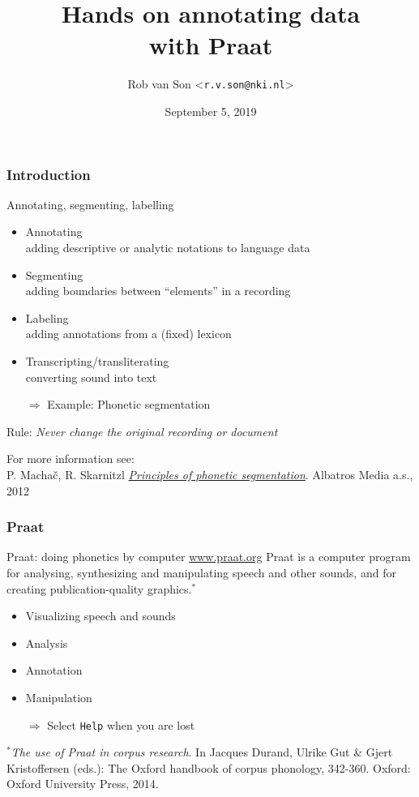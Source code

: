 \documentclass{beamer}
\title{Hands on annotating data\\ with Praat}
\date{September 5, 2019}
\author{Rob van Son <\texttt{r.v.son@nki.nl}>}
\begin{document}
\begin{frame}[plain]
\titlepage
\end{frame}


\begin{frame} 
\frametitle{Introduction} 
\begin{block}{Annotating, segmenting, labelling}
\begin{itemize} 
\item Annotating\\ adding descriptive or analytic notations to language data
\item Segmenting\\ adding boundaries between ``elements'' in a recording
\item Labeling\\ adding annotations from a (fixed) lexicon
\item Transcripting/transliterating\\ converting sound into text
\item[$\Rightarrow$] Example: Phonetic segmentation
\end{itemize}
\end{block} 
Rule: \textit{Never change the original recording or document}

\vskip 0.5cm
\scriptsize{For more information see:\\ P. Machač, R. Skarnitzl
 \textit{\href{https://www.researchgate.net/publication/234052076_Principles_of_Phonetic_Segmentation}{Principles of phonetic segmentation}}. Albatros Media a.s., 2012}
\end{frame}


\begin{frame} 
\frametitle{Praat} 
\begin{block}{Praat: doing phonetics by computer \hskip 0.5cm \url{www.praat.org}}
Praat is a computer program for analysing, synthesizing and manipulating speech and other sounds, and for creating publication-quality graphics.$^*$
\end{block} 
\begin{itemize} 
\item Visualizing speech and sounds
\item Analysis
\item Annotation
\item Manipulation
\item[$\Rightarrow$] Select \texttt{Help} when you are lost
\end{itemize}

\vskip 0.3cm
\scriptsize{$^*$\textit{The use of Praat in corpus research}.
In Jacques Durand, Ulrike Gut \& Gjert Kristoffersen (eds.): The Oxford handbook of corpus phonology, 342-360. Oxford: Oxford University Press, 2014.}
\end{frame}
\end{document}
